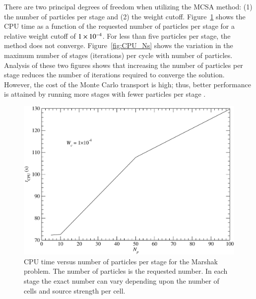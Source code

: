 \documentclass[preprint,12pt]{elsarticle}
\begin{document}
There are two principal degrees of freedom when utilizing the MCSA method: (1)
the number of particles per stage and (2) the weight cutoff.
Figure~\ref{fig:CPU_Np} shows the CPU time as a function of the requested
number of particles per stage for a relative weight cutoff of $1\times 10^{-4}$.
For less than five particles per stage, the method does not converge.
Figure~\ref{fig:CPU_Ns} shows the variation in the maximum number of stages
(iterations) per cycle with number of particles.  Analysis of these two
figures shows that increasing the number of particles per stage reduces the
number of iterations required to converge the solution.  However, the cost of
the Monte Carlo transport is high; thus, better performance is attained by
running more stages with fewer particles per stage \cite{evans_2003}.
\begin{figure}[ht!]
  \centerline{ \includegraphics[width=5in,clip]{mrshk_np_CPU.pdf}}
  \caption{CPU time versus number of particles per stage for the
    Marshak problem.  The number of particles is the requested number.
    In each stage the exact number can vary depending upon the number
    of cells and source strength per cell.}
  \label{fig:CPU_Np}
\end{figure}
\end{document}
